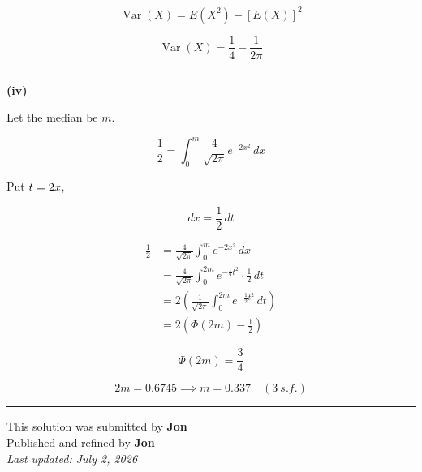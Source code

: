 \documentclass[12pt]{article}
\begin{document}
$$\operatorname{Var}(X)=E(X^2)-[E(X)]^2$$

$$\operatorname{Var}(X)=\frac14-\frac1{2\pi}$$

\bigskip\hrule\bigskip

\textbf{(iv)}

Let the median be $m$.

$$\frac12=\int_0^m \frac4{\sqrt{2\pi}}e^{-2x^2}\,dx$$

Put $\displaystyle t=2x$,

$$dx=\frac12\,dt$$

\begin{align*}
\frac12
&=\frac4{\sqrt{2\pi}}\int_0^m e^{-2x^2}\,dx\\
&=\frac4{\sqrt{2\pi}}\int_0^{2m} e^{-\frac12t^2}\cdot \frac12\,dt\\
&=2\left(\frac1{\sqrt{2\pi}}\int_0^{2m}e^{-\frac12t^2}\,dt\right)\\
&=2\left(\Phi(2m)-\frac12\right)
\end{align*}

$$\Phi(2m)=\frac34$$

$$2m=0.6745\implies m=0.337 \quad  (3\  s.f.)$$

\bigskip
\hrule
\begin{center}
    This solution was submitted by \textbf{Jon}\\[4pt]
    Published and refined by \textbf{Jon}\\[8pt]
    \textit{Last updated: July 2, 2026}
\end{center}
\end{document}
